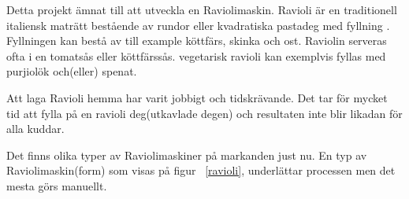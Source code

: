 Detta projekt ämnat till att utveckla en Raviolimaskin. Ravioli är en traditionell italiensk maträtt bestående av rundor eller kvadratiska pastadeg med fyllning \cite{engproc}. Fyllningen kan bestå av till example köttfärs, skinka och ost. Raviolin serveras ofta i en tomatsås eller köttfärssås. vegetarisk ravioli kan exemplvis fyllas med purjiolök och(eller) spenat.\medskip

Att laga Ravioli hemma har varit jobbigt och tidskrävande. Det tar för mycket tid att fylla på en ravioli deg(utkavlade degen) och resultaten inte blir likadan för alla kuddar.\medskip

Det finns olika typer av Raviolimaskiner på markanden just nu. En typ av Raviolimaskin(form) som visas på figur ~\ref{ravioli}, underlättar processen men det mesta görs manuellt.\medskip

